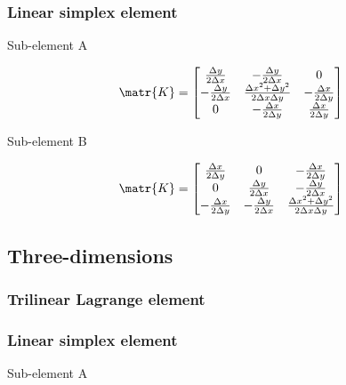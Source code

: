 \subsubsection{Linear simplex element}

Sub-element A

\begin{equation}
  \matr{K}=\begin{bmatrix}
  \frac{\Delta y}{2\Delta x} & -\frac{\Delta y}{2\Delta x} & 0 \\
  -\frac{\Delta y}{2\Delta x} & \frac{{\Delta x}^{2}+{\Delta y}^{2}}{2\Delta x\Delta y} & -\frac{\Delta x}{2\Delta y} \\
  0 & -\frac{\Delta x}{2\Delta y} & \frac{\Delta x}{2\Delta y}
  \end{bmatrix}
\end{equation}

Sub-element B

\begin{equation}
  \matr{K}=\begin{bmatrix}
  \frac{\Delta x}{2\Delta y} & 0 & -\frac{\Delta x}{2\Delta y} \\
  0 & \frac{\Delta y}{2\Delta x} & -\frac{\Delta y}{2\Delta x} \\
  -\frac{\Delta x}{2\Delta y} & -\frac{\Delta y}{2\Delta x} & \frac{{\Delta x}^{2}+{\Delta y}^{2}}{2\Delta x\Delta y}
  \end{bmatrix}
\end{equation}


\subsection{Three-dimensions}

\subsubsection{Trilinear Lagrange element}


\subsubsection{Linear simplex element}

Sub-element A

